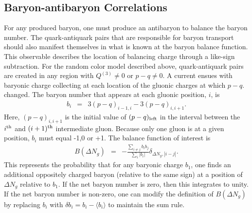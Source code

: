 \documentclass[aps, prc, 12pt, nofootinbib, showpacs, superscriptaddress, tightenlines, groupedaddress]{revtex4-2}
\begin{document}
\subsection{Baryon-antibaryon Correlations}

For any produced baryon, one must produce an antibaryon to balance the baryon number. The quark-antiquark pairs that are responsible for baryon transport should also manifest themselves in what is known at the baryon balance function. This observable describes the location of balancing charge through a like-sign subtraction. For the random color model described above, quark-antiquark pairs are created in any region with $Q^{(3)}\ne 0$ or $p-q\ne 0$. A current ensues with baryonic charge collecting at each location of the gluonic charges at which $p-q$. changed. The baryon number that appears at each gluonic position, $i$, is 
\begin{eqnarray}
 b_i&=&3(p-q)_{i-1,i}-3(p-q)_{i,i+1}.
 \end{eqnarray}
 Here, $(p-q)_{i,i+1}$ is the initial value of $(p-q)_{\rm left}$ in the interval between the $i^{\rm th}$ and $(i+1)^{\rm th}$ intermediate gluon. Because only one gluon is at a given position, $b_i$ must equal -1,0 or +1. The balance function of interest is
\begin{eqnarray}
B(\Delta N_g)&=&-\frac{\sum_{i\ne j}b_ib_j}{\sum_i|b_i|}\delta_{\Delta N_g,|i-j|}.
\end{eqnarray}
This represents the probability that for any baryonic charge $b_1$, one finds an additional oppositely charged baryon (relative to the same sign) at a position of $\Delta N_g$ relative to $b_1$. If the net baryon number is zero, then this integrates to unity. If the net baryon number is non-zero, one can modify the definition of $B(\Delta N_g)$ by replacing $b_i$ with $\delta b_i=b_i-\langle b_i\rangle$ to maintain the sum rule. 
\end{document}
